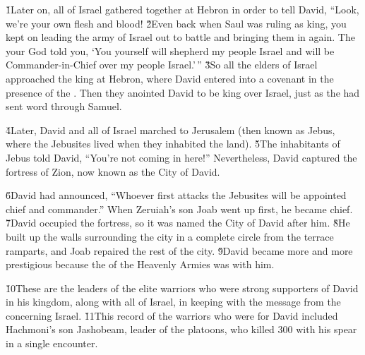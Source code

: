 \v{1}Later on, all of Israel gathered together at Hebron in order to tell David, ``Look, we're your own flesh and blood! \v{2}Even back when Saul was ruling as king, you kept on leading the army of Israel out to battle and bringing them in again. The  your God told you, `You yourself will shepherd my people Israel and will be Commander-in-Chief over my people Israel.'\,'' \v{3}So all the elders of Israel approached the king at Hebron, where David entered into a covenant in the presence of the . Then they anointed David to be king over Israel, just as the  had sent word through Samuel.

\v{4}Later, David and all of Israel marched to Jerusalem (then known as Jebus, where the Jebusites lived when they inhabited the land). \v{5}The inhabitants of Jebus told David, ``You're not coming in here!'' Nevertheless, David captured the fortress of Zion, now known as the City of David.

\v{6}David had announced, ``Whoever first attacks the Jebusites will be appointed chief and commander.'' When Zeruiah's son Joab went up first, he became chief. \v{7}David occupied the fortress, so it was named the City of David after him. \v{8}He built up the walls surrounding the city in a complete circle from the terrace ramparts, and Joab repaired the rest of the city. \v{9}David became more and more prestigious because the  of the Heavenly Armies was with him.

\v{10}These are the leaders of the elite warriors who were strong supporters of David in his kingdom, along with all of Israel, in keeping with the message from the  concerning Israel. \v{11}This record of the warriors who were for David included Hachmoni's son Jashobeam, leader of the platoons, who killed 300 with his spear in a single encounter.

